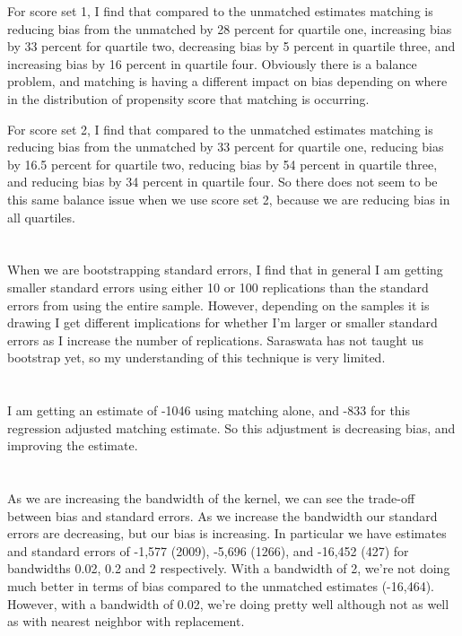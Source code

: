 \documentclass[11pt]{article}
\theoremstyle{definition}
\begin{document}
For score set 1,  I find that compared to the unmatched estimates matching is reducing bias from the unmatched by 28 percent for quartile one, increasing bias by 33 percent for quartile two, decreasing bias by 5 percent in quartile three, and increasing bias by 16 percent in quartile four.  Obviously there is a balance problem, and matching is having a different impact on bias depending on where in the distribution of propensity score that matching is occurring. 

For score set 2, I find that compared to the unmatched estimates matching is reducing bias from the unmatched by 33 percent for quartile one, reducing bias by 16.5 percent for quartile two, reducing bias by 54 percent in quartile three, and reducing bias by 34 percent in quartile four. So there does not seem to be this same balance issue when we use score set 2, because we are reducing bias in all quartiles.  

\section{}
When we are bootstrapping standard errors, I find that in general I am getting smaller standard errors using either 10 or 100 replications than the standard errors from using the entire sample.  However, depending on the samples it is drawing I get different implications for whether I'm larger or smaller standard errors as I increase the number of replications.  Saraswata has not taught us bootstrap yet, so my understanding of this technique is very limited. 

\section{}
I am getting an estimate of -1046 using matching alone, and -833 for this regression adjusted matching estimate.  So this adjustment is decreasing bias, and improving the estimate.

\section{}
As we are increasing the bandwidth of the kernel, we can see the trade-off between bias and standard errors.  As we increase the bandwidth our standard errors are decreasing, but our bias is increasing.  In particular we have estimates and standard errors of -1,577 (2009), -5,696 (1266), and -16,452 (427) for bandwidths 0.02, 0.2 and 2 respectively.  With a bandwidth of 2, we're not doing much better in terms of bias compared to the unmatched estimates (-16,464).  However, with a bandwidth of 0.02, we're doing pretty well although not as well as with nearest neighbor with replacement.
\end{document}
